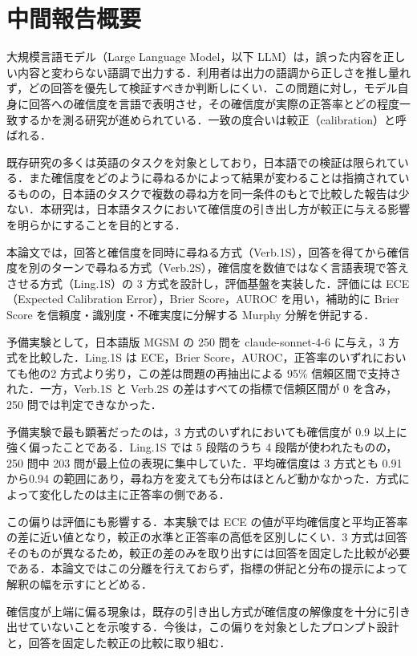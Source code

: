 \chapter*{中間報告概要}

大規模言語モデル（Large Language Model，以下 LLM）は，誤った内容を正しい内容と変わらない語調で出力する．利用者は出力の語調から正しさを推し量れず，どの回答を優先して検証すべきか判断しにくい．この問題に対し，モデル自身に回答への確信度を言語で表明させ，その確信度が実際の正答率とどの程度一致するかを測る研究が進められている．一致の度合いは較正（calibration）と呼ばれる．

既存研究の多くは英語のタスクを対象としており，日本語での検証は限られている．また確信度をどのように尋ねるかによって結果が変わることは指摘されているものの，日本語のタスクで複数の尋ね方を同一条件のもとで比較した報告は少ない．本研究は，日本語タスクにおいて確信度の引き出し方が較正に与える影響を明らかにすることを目的とする．

本論文では，回答と確信度を同時に尋ねる方式（Verb.1S），回答を得てから確信度を別のターンで尋ねる方式（Verb.2S），確信度を数値ではなく言語表現で答えさせる方式（Ling.1S）の 3 方式を設計し，評価基盤を実装した．評価には ECE（Expected Calibration Error），Brier Score，AUROC を用い，補助的に Brier Score を信頼度・識別度・不確実度に分解する Murphy 分解を併記する．

予備実験として，日本語版 MGSM の 250 問を claude-sonnet-4-6 に与え，3 方式を比較した．Ling.1S は ECE，Brier Score，AUROC，正答率のいずれにおいても他の2 方式より劣り，この差は問題の再抽出による 95\% 信頼区間で支持された．一方，Verb.1S と Verb.2S の差はすべての指標で信頼区間が 0 を含み，250 問では判定できなかった．

予備実験で最も顕著だったのは，3 方式のいずれにおいても確信度が 0.9 以上に強く偏ったことである．Ling.1S では 5 段階のうち 4 段階が使われたものの，250 問中 203 問が最上位の表現に集中していた．平均確信度は 3 方式とも 0.91 から0.94 の範囲にあり，尋ね方を変えても分布はほとんど動かなかった．方式によって変化したのは主に正答率の側である．

この偏りは評価にも影響する．本実験では ECE の値が平均確信度と平均正答率の差に近い値となり，較正の水準と正答率の高低を区別しにくい．3 方式は回答そのものが異なるため，較正の差のみを取り出すには回答を固定した比較が必要である．本論文ではこの分離を行えておらず，指標の併記と分布の提示によって解釈の幅を示すにとどめる．

確信度が上端に偏る現象は，既存の引き出し方式が確信度の解像度を十分に引き出せていないことを示唆する．今後は，この偏りを対象としたプロンプト設計と，回答を固定した較正の比較に取り組む．
